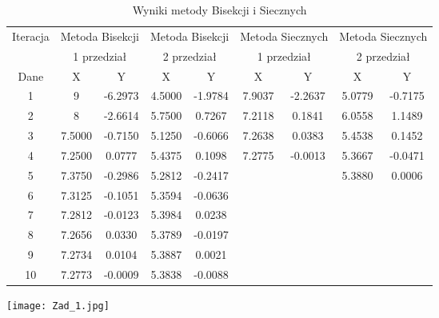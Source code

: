 \documentclass[a4paper, 11pt]{article}
\begin{document}
\begin{enumerate}
\begin{itemize}
\begin{center}
\begin{table}[p]
\begin{tabular}{|c|c|c|c|c|c|c|c|c|}
Iteracja &\multicolumn{2}{c|}{Metoda Bisekcji} & \multicolumn{2}{c|}{Metoda Bisekcji}  & \multicolumn{2}{c|}{Metoda Siecznych}  & \multicolumn{2}{c|}{Metoda Siecznych}  \\     
                                                               
 &\multicolumn{2}{c|}{1 przedział}  & \multicolumn{2}{c|}{2 przedział}   & \multicolumn{2}{c|}{1 przedział}  & \multicolumn{2}{c|}{2 przedział}  \\     
\hline   
Dane & X & Y & X & Y & X & Y  & X & Y\\ \hline                                                                                                                                                  
1 & 9 & -6.2973 & 4.5000 & -1.9784 & 7.9037 & -2.2637 & 5.0779 & -0.7175 \\
\hline                                                                          
2 & 8 & -2.6614 & 5.7500 & 0.7267 & 7.2118 & 0.1841 & 6.0558 & 1.1489 \\   
\hline                                                                          
3 & 7.5000 & -0.7150 & 5.1250 & -0.6066 & 7.2638 & 0.0383 & 5.4538 & 0.1452 \\  
\hline                                                                          
4 & 7.2500 & 0.0777 & 5.4375 & 0.1098 & 7.2775 & -0.0013 & 5.3667 & -0.0471 \\  
\hline                                                                          
5 & 7.3750 & -0.2986 & 5.2812 & -0.2417 & &  & 5.3880 & 0.0006 \\     
\hline                                                                          
6 & 7.3125 & -0.1051 & 5.3594 & -0.0636 & &  &  &  \\        
\hline                                                                          
7 & 7.2812 & -0.0123 & 5.3984 & 0.0238 &  &  & &  \\         
\hline                                                                          
8 & 7.2656 & 0.0330 & 5.3789 & -0.0197 & &  &  &  \\         
\hline                                                                          
9 & 7.2734 & 0.0104 & 5.3887 & 0.0021 & &  &  &  \\          
\hline                                                                          
10 & 7.2773 & -0.0009 & 5.3838 & -0.0088 &  &  &  & \\ 
\hline                                                                          
\end{tabular}                                           
\caption{Wyniki metody Bisekcji i Siecznych}                                     
\label{table:Wyniki metody Bisekcji i Siecznych}                                 
\end{table}     
\end{center}
\texttt{[image: Zad\_1.jpg]}


\end{itemize}
\end{enumerate}
\end{document}
